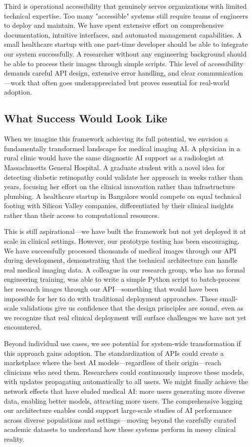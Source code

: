 \documentclass[12pt,a4paper]{article}
\begin{document}
Third is operational accessibility that genuinely serves organizations with limited technical expertise. Too many "accessible" systems still require teams of engineers to deploy and maintain. We have spent extensive effort on comprehensive documentation, intuitive interfaces, and automated management capabilities. A small healthcare startup with one part-time developer should be able to integrate our system successfully. A researcher without any engineering background should be able to process their images through simple scripts. This level of accessibility demands careful API design, extensive error handling, and clear communication—work that often goes underappreciated but proves essential for real-world adoption.

\subsection{What Success Would Look Like}

When we imagine this framework achieving its full potential, we envision a fundamentally transformed landscape for medical imaging AI. A physician in a rural clinic would have the same diagnostic AI support as a radiologist at Massachusetts General Hospital. A graduate student with a novel idea for detecting diabetic retinopathy could validate her approach in weeks rather than years, focusing her effort on the clinical innovation rather than infrastructure plumbing. A healthcare startup in Bangalore would compete on equal technical footing with Silicon Valley companies, differentiated by their clinical insights rather than their access to computational resources.

This is still aspirational—we have built the framework but not yet deployed it at scale in clinical settings. However, our prototype testing has been encouraging. We have successfully processed thousands of medical images through our API during development, demonstrating that the technical architecture can handle real medical imaging data. A colleague in our research group, who has no formal engineering training, was able to write a simple Python script to batch-process her research images through our API—something that would have been impossible for her to do with traditional deployment approaches. These small-scale validations give us confidence that the design principles are sound, even as we recognize that real clinical deployment will surface challenges we have not yet encountered.

Beyond individual use cases, we see potential for system-wide transformation if this approach gains adoption. The standardization of APIs could create a marketplace where the best AI models—regardless of their origin—reach clinicians who need them. Researchers could continuously improve these models, with updates propagating automatically to all users. We might finally achieve the network effects that have eluded medical AI: more users generating more diverse data, enabling better models, attracting more users. The comprehensive logging our architecture enables could support large-scale studies of AI performance across diverse populations and settings—moving beyond the carefully curated academic datasets to understand how these systems perform in messy clinical reality.
\end{document}
